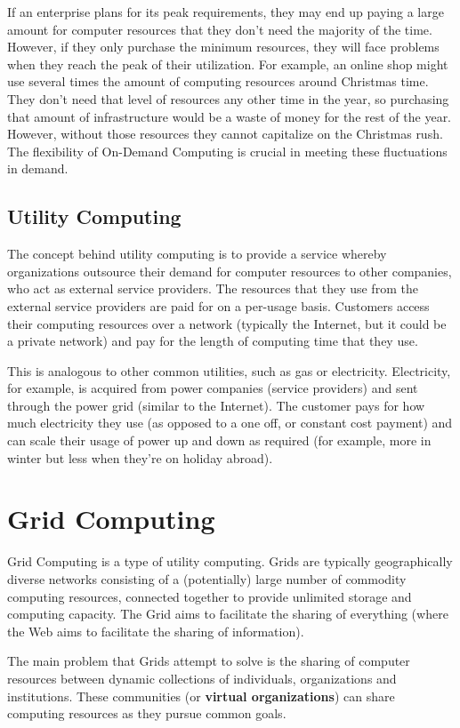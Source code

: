 \documentclass{article}
\begin{document}
If an enterprise plans for its peak requirements, they may end up paying a large amount for computer resources that they don't need the majority of the time. However, if they only purchase the minimum resources, they will face problems when they reach the peak of their utilization. For example, an online shop might use several times the amount of computing resources around Christmas time. They don't need that level of resources any other time in the year, so purchasing that amount of infrastructure would be a waste of money for the rest of the year. However, without those resources they cannot capitalize on the Christmas rush. The flexibility of On-Demand Computing is crucial in meeting these fluctuations in demand.

\subsection{Utility Computing}
The concept behind utility computing is to provide a service whereby organizations outsource their demand for computer resources to other companies, who act as external service providers. The resources that they use from the external service providers are paid for on a per-usage basis. Customers access their computing resources over a network (typically the Internet, but it could be a private network) and pay for the length of computing time that they use. 

This is analogous to other common utilities, such as gas or electricity. Electricity, for example, is acquired from power companies (service providers) and sent through the power grid (similar to the Internet). The customer pays for how much electricity they use (as opposed to a one off, or constant cost payment) and can scale their usage of power up and down as required (for example, more in winter but less when they're on holiday abroad).

\section{Grid Computing}
Grid Computing is a type of utility computing. Grids are typically geographically diverse networks consisting of a (potentially) large number of commodity computing resources, connected together to provide unlimited storage and computing capacity. The Grid aims to facilitate the sharing of everything (where the Web aims to facilitate the sharing of information). 

The main problem that Grids attempt to solve is the sharing of computer resources between dynamic collections of individuals, organizations and institutions. These communities (or \textbf{virtual organizations}) can share computing resources as they pursue common goals. 
\end{document}
